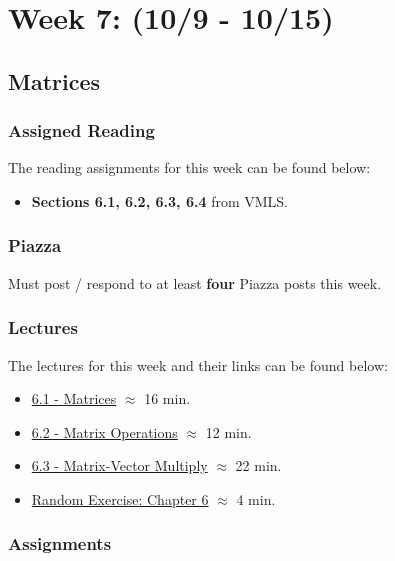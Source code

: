 \clearpage
\chapter{Week 7: (10/9 - 10/15)}

\section{Matrices}

\subsection{Assigned Reading}

The reading assignments for this week can be found below:

\begin{itemize}
    \item \textbf{Sections 6.1, 6.2, 6.3, 6.4} from VMLS.
\end{itemize}

\subsection{Piazza}

Must post / respond to at least \textbf{four} Piazza posts this week.  

\subsection{Lectures}

The lectures for this week and their links can be found below:

\begin{itemize}
    \item \href{https://applied.cs.colorado.edu/mod/hvp/view.php?id=50733}{6.1 - Matrices} $\approx$ 16 min.
    \item \href{https://applied.cs.colorado.edu/mod/hvp/view.php?id=50734}{6.2 - Matrix Operations} $\approx$ 12 min.
    \item \href{https://applied.cs.colorado.edu/mod/hvp/view.php?id=50735}{6.3 - Matrix-Vector Multiply} $\approx$ 22 min.
    \item \href{https://applied.cs.colorado.edu/mod/hvp/view.php?id=50736}{Random Exercise: Chapter 6} $\approx$ 4 min.
\end{itemize}

\subsection{Assignments}

